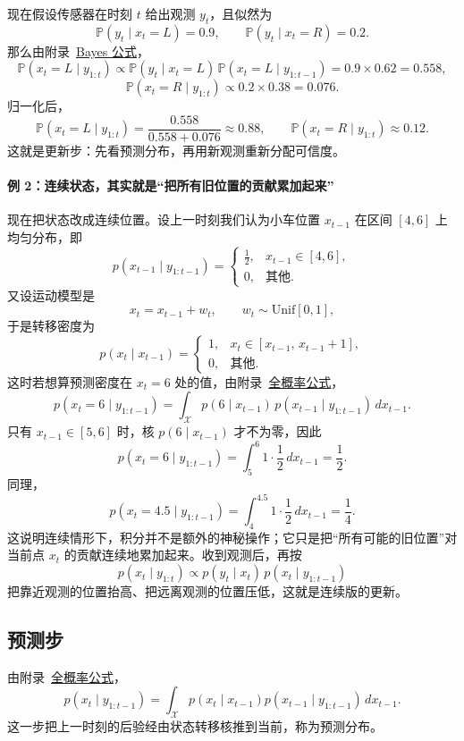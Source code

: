 \documentclass[12pt,a4paper]{ctexart}
\begin{document}
现在假设传感器在时刻 \(t\) 给出观测 \(y_t\)，且似然为
\[
\mathbb{P}(y_t \mid x_t=L)=0.9,
\qquad
\mathbb{P}(y_t \mid x_t=R)=0.2.
\]
那么由附录~\hyperref[app:bayes-formula]{Bayes 公式}，
\[
\mathbb{P}(x_t=L \mid y_{1:t})
\propto
\mathbb{P}(y_t \mid x_t=L)\,
\mathbb{P}(x_t=L \mid y_{1:t-1})
= 0.9\times 0.62 = 0.558,
\]
\[
\mathbb{P}(x_t=R \mid y_{1:t})
\propto
0.2\times 0.38 = 0.076.
\]
归一化后，
\[
\mathbb{P}(x_t=L \mid y_{1:t})
= \frac{0.558}{0.558+0.076}
\approx 0.88,
\qquad
\mathbb{P}(x_t=R \mid y_{1:t})
\approx 0.12.
\]
这就是更新步：先看预测分布，再用新观测重新分配可信度。

\paragraph{例 2：连续状态，其实就是“把所有旧位置的贡献累加起来”}
现在把状态改成连续位置。设上一时刻我们认为小车位置 \(x_{t-1}\) 在区间 \([4,6]\) 上均匀分布，即
\[
p(x_{t-1} \mid y_{1:t-1})
=
\begin{cases}
\frac12, & x_{t-1}\in[4,6],\\
0, & \text{其他}.
\end{cases}
\]
又设运动模型是
\[
x_t = x_{t-1} + w_t,
\qquad
w_t \sim \mathrm{Unif}[0,1],
\]
于是转移密度为
\[
p(x_t \mid x_{t-1})
=
\begin{cases}
1, & x_t\in[x_{t-1},\,x_{t-1}+1],\\
0, & \text{其他}.
\end{cases}
\]
这时若想算预测密度在 \(x_t=6\) 处的值，由附录~\hyperref[app:total-prob]{全概率公式}，
\[
p(x_t=6 \mid y_{1:t-1})
= \int_{\mathcal X} p(6 \mid x_{t-1})\, p(x_{t-1} \mid y_{1:t-1})\, dx_{t-1}.
\]
只有 \(x_{t-1}\in[5,6]\) 时，核 \(p(6 \mid x_{t-1})\) 才不为零，因此
\[
p(x_t=6 \mid y_{1:t-1})
= \int_{5}^{6} 1\cdot \frac12\, dx_{t-1}
= \frac12.
\]
同理，
\[
p(x_t=4.5 \mid y_{1:t-1})
= \int_{4}^{4.5} 1\cdot \frac12\, dx_{t-1}
= \frac14.
\]
这说明连续情形下，积分并不是额外的神秘操作；它只是把“所有可能的旧位置”对当前点 \(x_t\) 的贡献连续地累加起来。收到观测后，再按
\[
p(x_t \mid y_{1:t})
\propto
p(y_t \mid x_t)\, p(x_t \mid y_{1:t-1})
\]
把靠近观测的位置抬高、把远离观测的位置压低，这就是连续版的更新。

\subsection{预测步}

由附录~\hyperref[app:total-prob]{全概率公式}，
\[
p(x_t \mid y_{1:t-1})
= \int_{\mathcal X} p(x_t \mid x_{t-1}) p(x_{t-1} \mid y_{1:t-1}) \, dx_{t-1}.
\]
这一步把上一时刻的后验经由状态转移核推到当前，称为预测分布。
\end{document}
